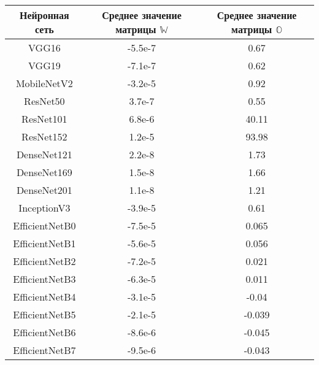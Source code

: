 \documentclass{article}
\begin{document}
\begin{center}
\begin{tabular}{ |c|c|c| } 
 \hline
 Нейронная сеть & Среднее значение матрицы $\mathbb{W}$ & Среднее значение матрицы $\mathbb{O}$ \\ 
 \hline
 \hline
 VGG16 & -5.5e-7 & 0.67 \\
 \hline
 VGG19 & -7.1e-7 & 0.62 \\
 \hline
 MobileNetV2 & -3.2e-5 & 0.92 \\
 \hline
 ResNet50 & 3.7e-7 & 0.55 \\
 \hline
 ResNet101 & 6.8e-6 & 40.11 \\
 \hline
 ResNet152 & 1.2e-5 & 93.98 \\
 \hline
 DenseNet121 & 2.2e-8 & 1.73 \\
 \hline
 DenseNet169 & 1.5e-8 & 1.66 \\
 \hline
 DenseNet201 & 1.1e-8 & 1.21 \\
 \hline
 InceptionV3 & -3.9e-5 & 0.61 \\
 \hline
 EfficientNetB0 & -7.5e-5 & 0.065 \\
 \hline
 EfficientNetB1 & -5.6e-5 & 0.056 \\
 \hline
 EfficientNetB2 & -7.2e-5 & 0.021 \\
 \hline
 EfficientNetB3 & -6.3e-5 & 0.011 \\
 \hline
 EfficientNetB4 & -3.1e-5 & -0.04 \\
 \hline
 EfficientNetB5 & -2.1e-5 & -0.039 \\
 \hline
 EfficientNetB6 & -8.6e-6 & -0.045 \\
 \hline
 EfficientNetB7 & -9.5e-6 & -0.043 \\
 \hline
\end{tabular}
\end{center}
\end{document}
